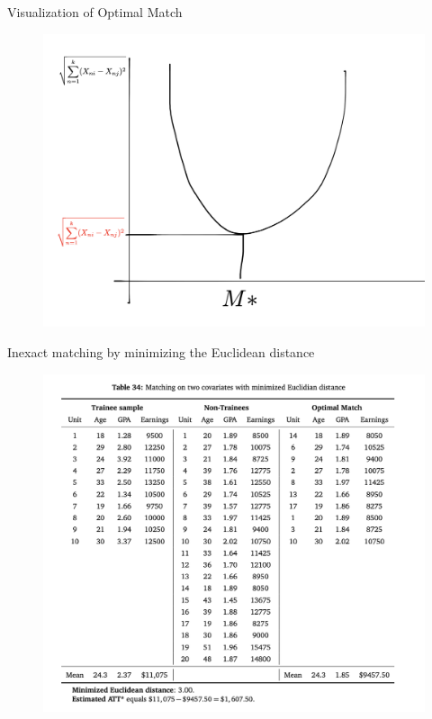\documentclass{beamer}
\begin{document}
\begin{frame}{Visualization of Optimal Match}

\begin{figure}[!t]\centering
\includegraphics[scale=0.35]{./lecture_includes/optimal_matches}
\end{figure}

\end{frame}


 

\begin{frame}{Inexact matching by minimizing the Euclidean distance}

\begin{figure}[!t]\centering
\includegraphics[scale=0.45]{./lecture_includes/inexact_euclidean}
\end{figure}

\end{frame}
\end{document}
